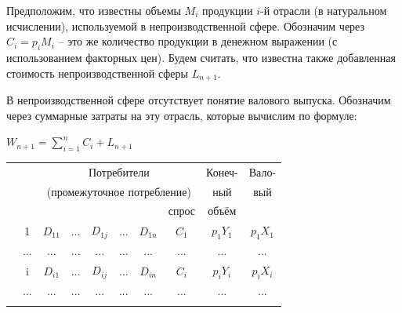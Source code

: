 \documentclass[12pt, 4paper]{book}
\begin{document}
{Предположим, что известны объемы $M_i$ продукции $i$-й отрасли (в натуральном исчислении), используемой в непроизводственной сфере. Обозначим через $C_i = p_i M_i$ – это же количество продукции в денежном выражении (с использованием факторных цен). Будем считать, что известна также добавленная стоимость непроизводственной сферы $L_{n+1}$.
\par

В непроизводственной сфере отсутствует понятие валового выпуска. Обозначим через   суммарные затраты на эту отрасль, которые вычислим по формуле: 
\begin{center}
	$W_{n+1}=\sum_{i=1}^n C_i + L_{n+1}$
\end{center}

\newpage
\begin{table}[h]
	\centering
	\begin{tabular}[center]{|p{0.2in}|p{0.2in}|p{0.2in}|p{0.2in}|p{0.2in}|p{0.2in}|p{0.2in}|p{0.2in}|p{0.3in}|p{0.3in}|}
		\hline
		\multicolumn{2}{|c|}{\multirow{2}{*}{}} & \multicolumn{6}{c|}{{\small Потребители}} & \multicolumn{1}{c|}{{\small Конеч-}} & \multicolumn{1}{c|}{{\small Вало-}}  \\
		\multicolumn{2}{|c|}{\multirow{2}{*}{}} & \multicolumn{6}{c|}{{\small (промежуточное потребление)}} & \multicolumn{1}{c|}{{\small ный}} & \multicolumn{1}{c|}{{\small вый}} \\ \hhline{~~------~} 
		\multicolumn{2}{|c|}{\multirow{2}{*}{}} & \centering {1} & \centering {...} & \centering {j} & \centering {...}  & \centering {N} & \centering {n+1} & \multicolumn{1}{c|}{{\small спрос}} & \multicolumn{1}{c|}{{\small объём}}\\ \hline
		\multicolumn{1}{|c|}{} & \multicolumn{1}{c|}{1}  & \multicolumn{1}{c|}{$D_{11}$} & \multicolumn{1}{c|}{...} & \multicolumn{1}{c|}{$D_{1j}$} & \multicolumn{1}{c|}{...} & \multicolumn{1}{c|}{$D_{1n}$} & \multicolumn{1}{c|}{$C_1$} & \multicolumn{1}{c|}{$ p_1Y_1 $} & \multicolumn{1}{c|}{$ p_1X_1 $}\\  \hhline{~---------}
		\multicolumn{1}{|c|}{} & \multicolumn{1}{c|}{...}  & \multicolumn{1}{c|}{...} & \multicolumn{1}{c|}{...} & \multicolumn{1}{c|}{...} & \multicolumn{1}{c|}{...} & \multicolumn{1}{c|}{...} & \multicolumn{1}{c|}{...} & \multicolumn{1}{c|}{...} & \multicolumn{1}{c|}{...}\\  \hhline{~---------}
		\multicolumn{1}{|c|}{} & \multicolumn{1}{c|}{i}  & \multicolumn{1}{c|}{$D_{i1}$} & \multicolumn{1}{c|}{...} & \multicolumn{1}{c|}{$D_{ij}$} & \multicolumn{1}{c|}{...} & \multicolumn{1}{c|}{$D_{in}$} & \multicolumn{1}{c|}{$C_i$}& \multicolumn{1}{c|}{$ p_iY_i $} & \multicolumn{1}{c|}{$p_iX_i$}\\  \hhline{~---------} 
		\multicolumn{1}{|c|}{} & \multicolumn{1}{c|}{...}  & \multicolumn{1}{c|}{...} & \multicolumn{1}{c|}{...} & \multicolumn{1}{c|}{...} & \multicolumn{1}{c|}{...} & \multicolumn{1}{c|}{...}& \multicolumn{1}{c|}{...}& \multicolumn{1}{c|}{...} & \multicolumn{1}{c|}{...}\\  \hhline{~---------} 
		

\end{tabular}
\end{table}}
\end{document}
